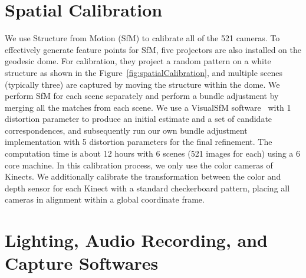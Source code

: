 \section{Spatial Calibration}
We use Structure from Motion (SfM) to calibrate all of the 521 cameras. To effectively generate feature points for SfM, five projectors are also installed on the geodesic dome. For calibration, they project a random pattern on a white structure as shown in the Figure~\ref{fig:spatialCalibration}, and multiple scenes (typically three) are captured by moving the structure within the dome. We perform SfM for each scene separately and perform a bundle adjustment by merging all the matches from each scene. We use a VisualSfM software~\cite{vsfm} with 1 distortion parameter to produce an initial estimate and a set of candidate correspondences, and subsequently run our own bundle adjustment implementation with 5 distortion parameters for the final refinement. The computation time is about 12 hours with 6 scenes (521 images for each) using a 6 core machine. 
In this calibration process, we only use the color cameras of Kinects. We additionally calibrate the transformation between the color and depth sensor for each Kinect with a standard checkerboard pattern, placing all cameras in alignment within a global coordinate frame.

\section{Lighting, Audio Recording, and Capture Softwares}

